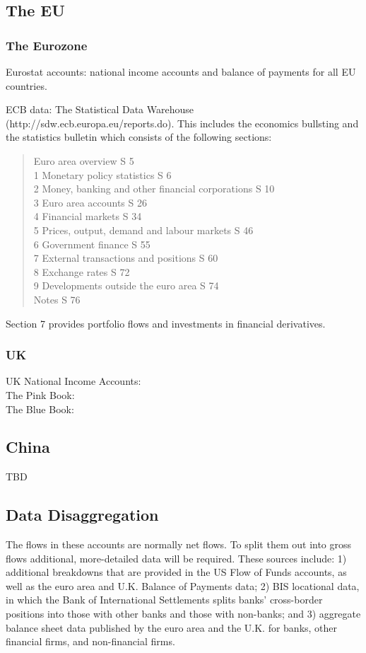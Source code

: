 \documentclass[twoside,a4paper,11pt]{article}
\begin{document}
\subsection{The EU}
\subsubsection{The Eurozone}
Eurostat accounts: national income accounts and balance of payments for all EU countries.

ECB data:
The Statistical Data Warehouse (http://sdw.ecb.europa.eu/reports.do). This includes the economics bullsting and the statistics bulletin which consists of the following sections:\\
\begin{quote}
Euro area overview S 5\\
1 Monetary policy statistics S 6\\
2 Money, banking and other financial corporations S 10\\
3 Euro area accounts S 26\\
4 Financial markets S 34\\
5 Prices, output, demand and labour markets S 46\\
6 Government finance S 55\\
7 External transactions and positions S 60\\
8 Exchange rates S 72\\
9 Developments outside the euro area S 74\\
Notes S 76\\
\end{quote}
Section 7 provides portfolio flows and investments in financial derivatives.

\subsubsection{UK}
UK National Income Accounts:\\
The Pink Book:\\
The Blue Book:

\subsection{China}
TBD

\subsection{Data Disaggregation}
The flows in these accounts are normally net flows. To split them out into gross flows additional, more-detailed data will be required. These sources include: 1) additional breakdowns that are provided in the US Flow of Funds accounts, as well as the euro area and U.K. Balance of Payments data; 2) BIS locational data, in which the Bank of International Settlements splits banks’ cross-border positions into those with other banks and those with non-banks; and 3) aggregate balance sheet data published by the euro area and the U.K. for banks, other financial firms, and non-financial firms.




\end{document}
